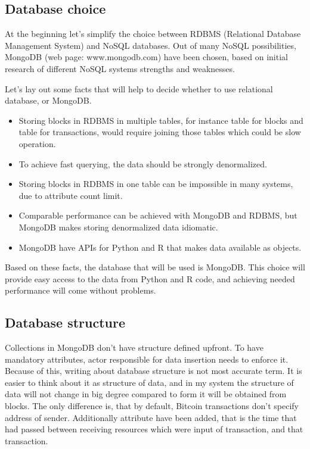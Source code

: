 \documentclass[12pt, en, eng, oneside]{mgr}
\begin{document}
\subsection{Database choice}
At the beginning let's simplify the choice between RDBMS (Relational Database Management System) and NoSQL databases. Out of many NoSQL possibilities, MongoDB (web page: www.mongodb.com) have been chosen, based on initial research of different NoSQL systems strengths and weaknesses.


Let's lay out some facts that will help to decide whether to use relational database, or MongoDB.

\begin{itemize}
\item 
Storing blocks in RDBMS in multiple tables, for instance table for blocks and table for transactions, would require joining those tables which could be slow operation.
\item 
To achieve fast querying, the data should be strongly denormalized.
\item
Storing blocks in RDBMS in one table can be impossible in many systems, due to attribute count limit.
\item 
Comparable performance can be achieved with MongoDB and RDBMS, but MongoDB makes storing denormalized data idiomatic.
\item
MongoDB have APIs for Python and R that makes data available as objects.
\end{itemize}

Based on these facts, the database that will be used is MongoDB. This choice will provide easy access to the data from Python and R code, and achieving needed performance will come without problems.


\subsection{Database structure}
 
Collections in MongoDB don't have structure defined upfront. To have mandatory attributes, actor responsible for data insertion needs to enforce it. Because of this, writing about database structure is not most accurate term. It is easier to think about it as structure of data, and in my system the structure of data will not change in big degree compared to form it will be obtained from blocks. The only difference is, that by default, Bitcoin transactions don't specify address of sender. Additionally attribute have been added, that is the time that had passed between receiving resources which were input of transaction, and that transaction.
\end{document}
